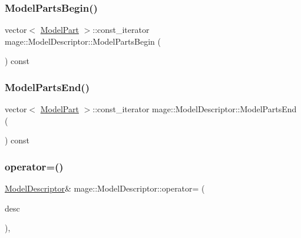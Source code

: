 \hypertarget{classmage_1_1_model_descriptor_a721a81fae1d5613af8a3a037577ce454}{}\label{classmage_1_1_model_descriptor_a721a81fae1d5613af8a3a037577ce454} 
\subsubsection{\texorpdfstring{Model\+Parts\+Begin()}{ModelPartsBegin()}}
{\footnotesize\ttfamily vector$<$ \hyperlink{structmage_1_1_model_part}{Model\+Part} $>$\+::const\+\_\+iterator mage\+::\+Model\+Descriptor\+::\+Model\+Parts\+Begin (\begin{DoxyParamCaption}{ }\end{DoxyParamCaption}) const}

\hypertarget{classmage_1_1_model_descriptor_a97f78d3e5a157020f62f5e6003deaac6}{}\label{classmage_1_1_model_descriptor_a97f78d3e5a157020f62f5e6003deaac6} 
\subsubsection{\texorpdfstring{Model\+Parts\+End()}{ModelPartsEnd()}}
{\footnotesize\ttfamily vector$<$ \hyperlink{structmage_1_1_model_part}{Model\+Part} $>$\+::const\+\_\+iterator mage\+::\+Model\+Descriptor\+::\+Model\+Parts\+End (\begin{DoxyParamCaption}{ }\end{DoxyParamCaption}) const}

\hypertarget{classmage_1_1_model_descriptor_a734b17224719896921e9f6252ee88483}{}\label{classmage_1_1_model_descriptor_a734b17224719896921e9f6252ee88483} 
\subsubsection{\texorpdfstring{operator=()}{operator=()}}
{\footnotesize\ttfamily \hyperlink{classmage_1_1_model_descriptor}{Model\+Descriptor}\& mage\+::\+Model\+Descriptor\+::operator= (\begin{DoxyParamCaption}\item[{const \hyperlink{classmage_1_1_model_descriptor}{Model\+Descriptor} \&}]{desc }\end{DoxyParamCaption})\hspace{0.3cm}{\ttfamily [private]}, {\ttfamily [delete]}}



